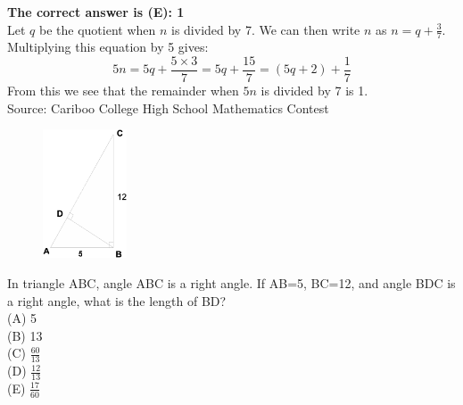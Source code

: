 \documentclass{article}
\begin{document}

\textbf{The correct answer is (E): 1}\\
Let $q$ be the quotient when $n$ is divided by 7. We can then write $n$ as $n=q+\frac{3}{7}$. Multiplying this equation by 5 gives:
\begin{equation*}
5n=5q+\frac{5\times3}{7}=5q+\frac{15}{7}= (5q+2)+\frac{1}{7}
\end{equation*}
From this we see that the remainder when $5n$ is divided by 7 is 1.
\\[5 ex]

\scriptsize
Source: Cariboo College High School Mathematics Contest

\normalsize
\begin{figure}
	\includegraphics[width=25mm,viewport=100 67 508 675]{CCSPR73-6pic.eps}
\end{figure}
In triangle ABC, angle ABC is a right angle. If AB=5, BC=12, and angle BDC is a right angle, what is the length of BD?\\
(A) 5\\[1 ex]
(B) 13\\[1 ex]
(C) $\frac{60}{13}$\\[1 ex]
(D) $\frac{12}{13}$\\[1 ex]
(E) $\frac{17}{60}$\\
\end{document}
